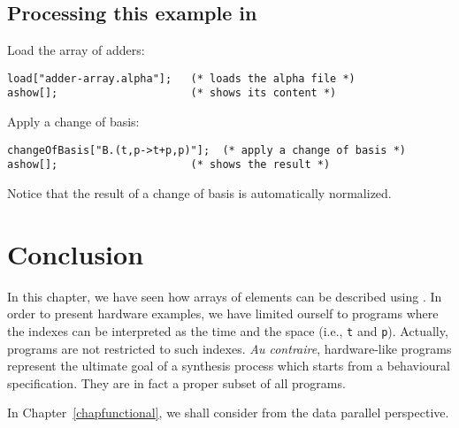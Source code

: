 %
%
%
%
%




\subsection*{Processing this example in {\mmalfa}}
Load the array of adders:
\begin{verbatim}
load["adder-array.alpha"];   (* loads the alpha file *)
ashow[];                     (* shows its content *)
\end{verbatim}
Apply a change of basis:
\begin{verbatim}
changeOfBasis["B.(t,p->t+p,p)"];  (* apply a change of basis *)
ashow[];                     (* shows the result *)
\end{verbatim}
Notice that the result of a change of basis is automatically normalized. 

\section{Conclusion}
In this chapter, we have seen how arrays of elements can be 
described using {\alfa}. In order to present hardware examples, we
have limited ourself to programs where the indexes can be
interpreted as the time and the space (i.e., {\tt t} and {\tt p}).
Actually, {\alfa} programs are not restricted to such indexes. 
{\em Au contraire}, hardware-like {\alfa} programs represent the 
ultimate goal of a synthesis process which starts from a 
behavioural specification. They are in fact a proper subset of all 
{\alfa} programs.

In Chapter~\ref{chapfunctional}, we shall consider {\alfa} from the
data parallel perspective. 